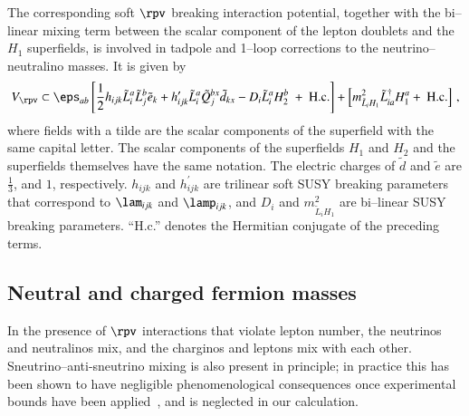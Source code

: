 \documentclass[pdflatex,final,3p,times]{elsarticle}
\begin{document}
The corresponding soft $\rpv$ breaking interaction potential, together
with the bi--linear mixing term between the scalar component of the
lepton doublets and the $H_1$ superfields, is involved in tadpole and
1--loop corrections to the neutrino--neutralino masses.  It is given
by
\begin{equation}
  V_{\rpv} \subset \eps_{ab} \left[\frac{1}{2} h_{ij k}\tilde{L}_i^a
    \tilde{L}_j^b \tilde{{e}}_k +h^\prime_{i jk} \tilde{L}_i^a
    \tilde{Q}_j^{bx} \tilde{d}_{kx} -D_i \tilde{L}_i^a
    H_2^b~+~{\rm H.c.}\right] + \left[m^2_{\tilde L_i
      H_1}\tilde{L}^\dagger_{ia}H_1^a +~{\rm H.c.}\right]\,,
  \label{soft}
\end{equation}
where fields with a tilde are the scalar components of the superfield
with the same capital letter.  The scalar components
of the superfields $H_1$ and $H_2$ and the superfields themselves have
the same notation.  The electric charges of $\tilde d$ and $\tilde e$
are $\frac{1}{3}$, and $1$, respectively.  $h_{ijk}$ and
$h^\prime_{ijk}$ are trilinear soft SUSY breaking parameters that
correspond to $\lam_{ijk}$ and $\lamp_{ijk}$, and $D_i$ and
$m^2_{\tilde{L}_iH_1}$ are bi--linear SUSY breaking parameters.  ``H.c.''
denotes the Hermitian conjugate of the preceding terms.




\subsection{Neutral and charged fermion masses \label{sec:tree}}

In the presence of $\rpv$ interactions that violate lepton number, the
neutrinos and neutralinos mix, and the charginos and leptons mix
with each other.  Sneutrino--anti-sneutrino mixing is also present in
principle; in practice this has been shown to have negligible
phenomenological consequences once experimental bounds have been
applied~\cite{Dedes:2007ef}, and is neglected in our calculation.
\end{document}
